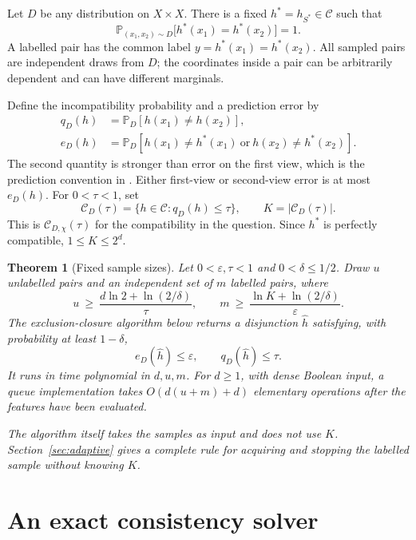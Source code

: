 \documentclass[11pt,a4paper]{article}
\newtheorem{theorem}{Theorem}
\newcommand{\C}{\mathcal C}
\newcommand{\Prb}{\mathbb P}
\begin{document}
Let \(D\) be any distribution on \(X\times X\). There is a fixed
\(h^*=h_{S^*}\in\C\) such that
\[
 \Prb_{(x_1,x_2)\sim D}\bigl[h^*(x_1)=h^*(x_2)\bigr]=1.
\]
A labelled pair has the common label \(y=h^*(x_1)=h^*(x_2)\).
All sampled pairs are independent draws from \(D\); the coordinates
inside a pair can be arbitrarily dependent and can have different marginals.

Define the incompatibility probability and a prediction error by
\begin{align}
 q_D(h)&=\Prb_D[h(x_1)\ne h(x_2)],\\
 e_D(h)&=\Prb_D[h(x_1)\ne h^*(x_1)
                 \ \text{or}\ h(x_2)\ne h^*(x_2)].
\end{align}
The second quantity is stronger than error on the first view, which is the
prediction convention in \cite{bb07}. Either first-view or second-view error
is at most \(e_D(h)\). For \(0<\tau<1\), set
\[
 \C_D(\tau)=\{h\in\C:q_D(h)\le\tau\},\qquad K=|\C_D(\tau)|.
\]
This is \(\C_{D,\chi}(\tau)\) for the compatibility in the question.
Since \(h^*\) is perfectly compatible, \(1\le K\le 2^d\).

\begin{theorem}[Fixed sample sizes]\label{thm:main}
Let \(0<\varepsilon,\tau<1\) and \(0<\delta\le1/2\).
Draw \(u\) unlabelled pairs and an independent set of \(m\) labelled pairs, where
\begin{equation}\label{eq:sizes}
 u\ \ge\ \frac{d\ln2+\ln(2/\delta)}{\tau},
 \qquad
 m\ \ge\ \frac{\ln K+\ln(2/\delta)}{\varepsilon}.
\end{equation}
The exclusion-closure algorithm below returns a disjunction \(\widehat h\)
satisfying, with probability at least \(1-\delta\),
\[
 e_D(\widehat h)\le\varepsilon,\qquad q_D(\widehat h)\le\tau.
\]
It runs in time polynomial in \(d,u,m\).
For \(d\ge1\), with dense Boolean input, a queue implementation takes \(O(d(u+m)+d)\)
elementary operations after the features have been evaluated.

The algorithm itself takes the samples as input and does not use \(K\).
Section~\ref{sec:adaptive} gives a complete rule for acquiring and stopping
the labelled sample without knowing \(K\).
\end{theorem}

\section{An exact consistency solver}
\end{document}
